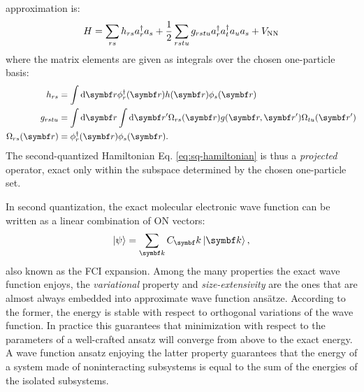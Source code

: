 approximation is:\autocite{Helgaker2000-tz, Shavitt2009-mr}
\begin{equation}\label{eq:sq-hamiltonian}
  H = \sum_{rs}h_{rs}a_{r}^{\dagger}a_{s}
  + \frac{1}{2}\sum_{rstu}g_{rstu}a_{r}^{\dagger}a_{t}^{\dagger}a_{u}a_{s}
  + V_\mathrm{NN}
\end{equation}
where the matrix elements are given as integrals over the chosen
one-particle basis:
\begin{subequations}
 \begin{align}
   h_{rs} &= \int \diff\vect{r} \phi_r^\dagger(\vect{r}) h(\vect{r})\phi_s(\vect{r}) \label{eq:one-el}\\
   g_{rstu} &=
   \int\diff\vect{r}\int\diff\vect{r}^\prime
   \Omega_{rs}(\vect{r}) g(\vect{r},\vect{r}^\prime) \Omega_{tu}(\vect{r}^\prime) \label{eq:two-el} \\
  \Omega_{rs}(\vect{r}) &= \phi_r^\dagger(\vect{r})\phi_s(\vect{r}). \label{eq:overlap}
 \end{align}
\end{subequations}
The second-quantized Hamiltonian Eq. \eqref{eq:sq-hamiltonian} is thus a
\emph{projected} operator, exact only within the subspace determined by
the chosen one-particle set.\autocite{Gross1991-hi, Helgaker2000-tz}

In second quantization, the exact molecular electronic wave function can
be written as a linear combination of \acrshort{ON} vectors:
\begin{equation}\label{eq:fci}
  \ket{\psi} = \sum_{\vect{k}}C_\vect{k}\ket{\vect{k}},
\end{equation}
also known as the \gls{FCI} expansion.
Among the many properties the exact wave function enjoys, the
\emph{variational} property and \emph{size-extensivity} are the ones
that are almost always embedded into approximate wave function ans\"{a}tze.\autocite{Helgaker2000-tz}
According to the former, the energy is stable with respect to orthogonal
variations of the wave function. In practice this guarantees that
minimization with respect to the parameters of a well-crafted ansatz
will converge from above to the exact energy.\autocite{Szabo1989-vl, McWeeny1992-oj, Helgaker2000-tz}
A wave function ansatz enjoying the latter property guarantees that the
energy of a system made of noninteracting subsystems is equal to the sum of
the energies of the isolated subsystems.\autocite{Helgaker2000-tz, Nooijen2005-ux}

